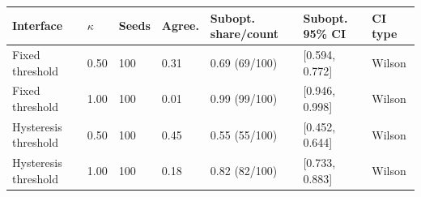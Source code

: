 \begin{tabular}{lllllll}
\toprule
Interface & $\kappa$ & Seeds & Agree. & Subopt. share/count & Subopt. 95\% CI & CI type \\
\midrule
Fixed threshold & 0.50 & 100 & 0.31 & 0.69 (69/100) & [0.594, 0.772] & Wilson \\
Fixed threshold & 1.00 & 100 & 0.01 & 0.99 (99/100) & [0.946, 0.998] & Wilson \\
Hysteresis threshold & 0.50 & 100 & 0.45 & 0.55 (55/100) & [0.452, 0.644] & Wilson \\
Hysteresis threshold & 1.00 & 100 & 0.18 & 0.82 (82/100) & [0.733, 0.883] & Wilson \\
\bottomrule
\end{tabular}
